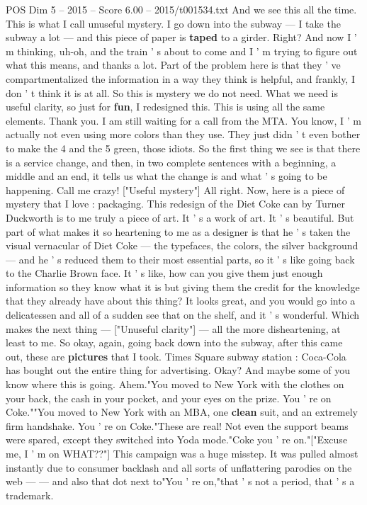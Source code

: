 \begin{textsample}{POS Dim 5 – 2015 – Score 6.00 – 2015/t001534.txt}
And we see this all the time.
This is what I call unuseful mystery.
I go down into the subway — I take the subway a lot — and this piece of paper is \textbf{taped} to a girder.
Right?
And now I ' m thinking, uh-oh, and the train ' s about to come and I ' m trying to figure out what this means, and thanks a lot.
Part of the problem here is that they ' ve compartmentalized the information in a way they think is helpful, and frankly, I don ' t think it is at all.
So this is mystery we do not need.
What we need is useful clarity, so just for \textbf{fun}, I redesigned this.
This is using all the same elements.
Thank you.
I am still waiting for a call from the MTA.
You know, I ' m actually not even using more colors than they use.
They just didn ' t even bother to make the 4 and the 5 green, those idiots.
So the first thing we see is that there is a service change, and then, in two complete sentences with a beginning, a middle and an end, it tells us what the change is and what ' s going to be happening.
Call me crazy! ["Useful mystery"] All right.
Now, here is a piece of mystery that I love : packaging.
This redesign of the Diet Coke can by Turner Duckworth is to me truly a piece of art.
It ' s a work of art.
It ' s beautiful.
But part of what makes it so heartening to me as a designer is that he ' s taken the visual vernacular of Diet Coke — the typefaces, the colors, the silver background — and he ' s reduced them to their most essential parts, so it ' s like going back to the Charlie Brown face.
It ' s like, how can you give them just enough information so they know what it is but giving them the credit for the knowledge that they already have about this thing?
It looks great, and you would go into a delicatessen and all of a sudden see that on the shelf, and it ' s wonderful.
Which makes the next thing — ["Unuseful clarity"] — all the more disheartening, at least to me.
So okay, again, going back down into the subway, after this came out, these are \textbf{pictures} that I took.
Times Square subway station : Coca-Cola has bought out the entire thing for advertising.
Okay?
And maybe some of you know where this is going.
Ahem."You moved to New York with the clothes on your back, the cash in your pocket, and your eyes on the prize.
You ' re on Coke.""You moved to New York with an MBA, one \textbf{clean} suit, and an extremely firm handshake.
You ' re on Coke."These are real!
Not even the support beams were spared, except they switched into Yoda mode."Coke you ' re on."["Excuse me, I ' m on WHAT??"] This campaign was a huge misstep.
It was pulled almost instantly due to consumer backlash and all sorts of unflattering parodies on the web — — and also that dot next to"You ' re on,"that ' s not a period, that ' s a trademark.

\end{textsample}
